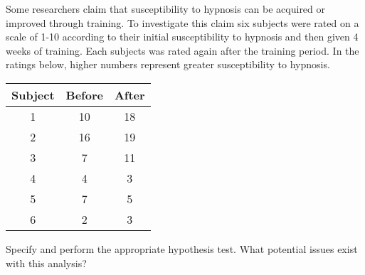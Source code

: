 
\begin{exercise}

Some researchers claim that susceptibility to hypnosis can be acquired
or improved through training. To investigate this claim six subjects
were rated on a scale of 1-10 according to their initial susceptibility
to hypnosis and then given 4 weeks of training. Each subjects was rated
again after the training period. In the ratings below, higher numbers
represent greater susceptibility to hypnosis.

\begin{center}
    \begin{tabular}{c|c|c}
    \hline
    Subject & Before & After \\
    \hline
    1 & 10 & 18 \\
    2 & 16 & 19 \\
    3 & 7 & 11 \\
    4 & 4 & 3 \\
    5 & 7 & 5 \\
    6 & 2 & 3 \\
    \hline
    \end{tabular}
\end{center}

Specify and perform the appropriate hypothesis test. What potential issues
exist with this analysis?

\end{exercise}


\begin{solution}

\phantom{}

\end{solution}

